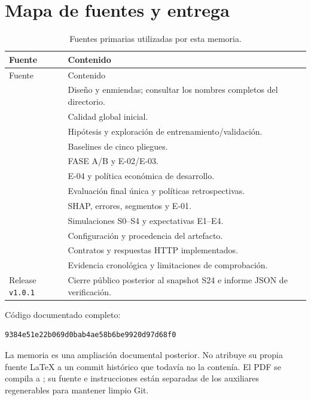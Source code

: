 \documentclass[11pt,a4paper,oneside]{report}
\begin{document}
\chapter{Mapa de fuentes y entrega}
\begin{longtable}{@{}L{0.42\textwidth}L{0.48\textwidth}@{}}
\caption{Fuentes primarias utilizadas por esta memoria.}\\
\toprule Fuente & Contenido \\\midrule\endfirsthead
\toprule Fuente & Contenido \\\midrule\endhead
{} & Diseño y enmiendas; consultar los nombres completos del directorio. \\
 & Calidad global inicial. \\
 & Hipótesis y exploración de entrenamiento/validación. \\
 & Baselines de cinco pliegues. \\
 & FASE A/B y E-02/E-03. \\
 & E-04 y política económica de desarrollo. \\
 & Evaluación final única y políticas retrospectivas. \\
 & SHAP, errores, segmentos y E-01. \\
 & Simulaciones S0--S4 y expectativas E1--E4. \\
 & Configuración y procedencia del artefacto. \\
 & Contratos y respuestas HTTP implementados. \\
 & Evidencia cronológica y limitaciones de comprobación. \\
Release \texttt{v1.0.1} & Cierre público posterior al snapshot S24 e informe JSON de verificación. \\
\bottomrule
\end{longtable}

Código documentado completo:
\begin{lstlisting}
9384e51e22b069d0bab4ae58b6be9920d97d68f0
\end{lstlisting}
La memoria es una ampliación documental posterior. No atribuye su propia
fuente LaTeX a un commit histórico que todavía no la contenía. El PDF se
compila a ; su fuente e instrucciones están separadas
de los auxiliares regenerables para mantener limpio Git.
\end{document}
